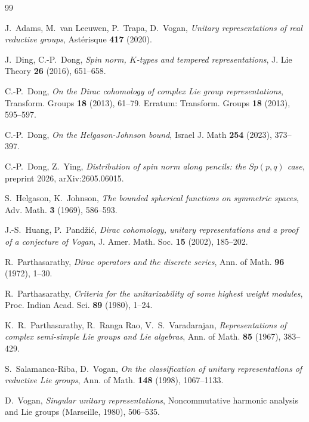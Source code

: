 \documentclass[11pt]{amsart}
\theoremstyle{plain}
\theoremstyle{definition}
\begin{document}



\begin{thebibliography}{99}
	
 J.~Adams, M.~van Leeuwen, P.~Trapa, D.~Vogan, \emph{Unitary representations of real reductive groups}, Ast{\'erisque} \textbf{417} (2020).	

	
 J.~Ding, C.-P.~Dong, \emph{Spin norm, $K$-types and tempered representations}, J.  Lie Theory
\textbf{26} (2016), 651--658.
	
 C.-P.~Dong,
	\emph{On the Dirac cohomology of complex Lie group representations},
	Transform. Groups \textbf{18} (2013), 61--79. Erratum: Transform.
	Groups \textbf{18} (2013), 595--597.
	
C.-P.~Dong, \emph{On the Helgason-Johnson bound}, Israel J. Math \textbf{254} (2023), 373--397.
	

 C.-P.~Dong, Z.~Ying,
	\emph{Distribution of spin norm along pencils: the $Sp(p, q)$ case},
	preprint 2026, arXiv:2605.06015.
	

	
 S.~Helgason, K.~Johnson, \emph{The bounded spherical functions on symmetric spaces}, Adv. Math.
	\textbf{3} (1969), 586--593.

 J.-S.~Huang, P.~Pand\v zi\'c, \emph{Dirac
cohomology, unitary representations and a proof of a conjecture of
Vogan}, J. Amer. Math. Soc.  \textbf{15} (2002), 185--202.



 R.~Parthasarathy, \emph{Dirac operators and the discrete
series}, Ann. of Math. \textbf{96} (1972), 1--30.

 R.~Parthasarathy,
\emph{Criteria for the unitarizability of some highest weight
modules}, Proc. Indian Acad. Sci. \textbf{89} (1980), 1--24.

 K.~R.~Parthasarathy, R.~Ranga Rao,
V.~S.~Varadarajan, \emph{Representations of complex semi-simple Lie
groups and Lie algebras}, Ann. of Math. \textbf{85} (1967),
383--429.
	
 S.~Salamanca-Riba, D.~Vogan, \emph{On the classification of unitary representations of reductive Lie groups}, Ann. of Math. \textbf{148} (1998), 1067--1133.
	
	
 D.~Vogan,
	\emph{Singular unitary representations},  Noncommutative harmonic
	analysis and Lie groups (Marseille, 1980),  506--535.
	

\end{thebibliography}
\end{document}
